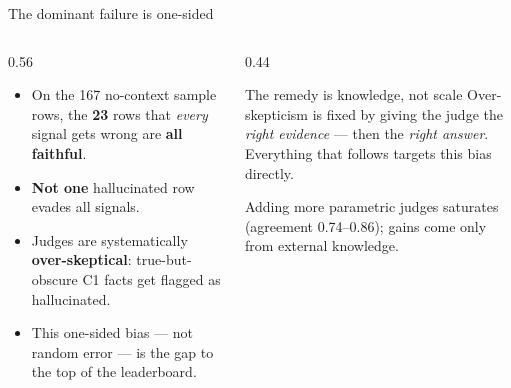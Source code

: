\documentclass[aspectratio=169,11pt,t]{beamer}
\newcommand{\metric}[1]{{\color{primary}\bfseries #1}}
\newcommand{\good}[1]{{\color{good}\bfseries #1}}
\newcommand{\bad}[1]{{\color{bad}\bfseries #1}}
\begin{document}
\begin{frame}{The dominant failure is one-sided}
  \begin{columns}[T]
    \begin{column}{0.56\textwidth}
      \begin{itemize}
        \item On the 167 no-context sample rows, the \metric{23} rows that \emph{every} signal gets wrong are \good{all faithful}.
        \item \textbf{Not one} hallucinated row evades all signals.
        \item Judges are systematically \bad{over-skeptical}: true-but-obscure C1 facts get flagged as hallucinated.
        \item This one-sided bias — not random error — is the gap to the top of the leaderboard.
      \end{itemize}
    \end{column}
    \begin{column}{0.44\textwidth}
      \begin{block}{The remedy is knowledge, not scale}
        Over-skepticism is fixed by giving the judge the \emph{right evidence} — then the \emph{right answer}.\\[0.4em]
        Everything that follows targets this bias directly.
      \end{block}
      \vspace{0.3em}
      {\footnotesize\color{soft} Adding more parametric judges saturates (agreement 0.74–0.86); gains come only from external knowledge.}
    \end{column}
  \end{columns}
\end{frame}
\end{document}
